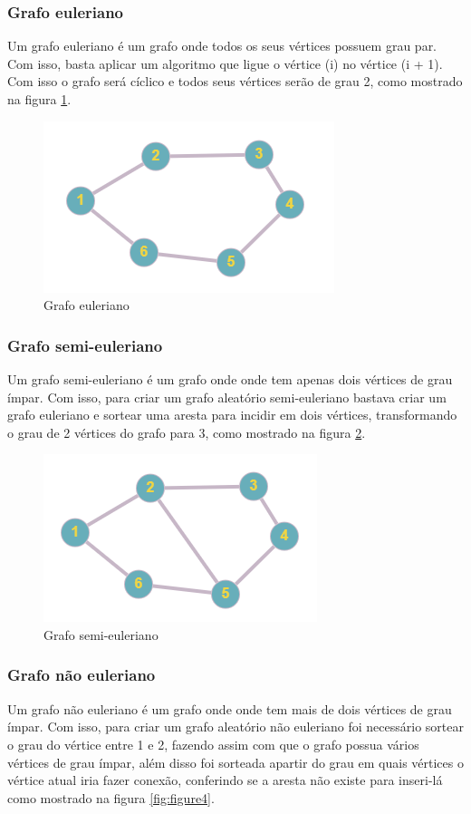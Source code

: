 \subsubsection{\esp Grafo euleriano}
Um grafo euleriano é um grafo onde todos os seus vértices possuem grau par. Com isso, basta aplicar um algoritmo que ligue o vértice (i) no vértice (i + 1). Com isso o grafo será cíclico e todos seus vértices serão de grau 2, como mostrado na figura \ref{fig:figure2}.

\begin{figure}[ht]
    \centering
    \includegraphics[width=.2\textwidth]{figuras/eureliano.png}
    \caption{Grafo euleriano}
    \label{fig:figure2}
\end{figure}

\subsubsection{\esp Grafo semi-euleriano}
Um grafo semi-euleriano é um grafo onde onde tem apenas dois vértices de grau ímpar. Com isso, para criar um grafo aleatório semi-euleriano bastava criar um grafo euleriano e sortear uma aresta para incidir em dois vértices, transformando o grau de 2 vértices do grafo para 3, como mostrado na figura \ref{fig:figure3}.

\begin{figure}[ht]
    \centering
    \includegraphics[width=.2\textwidth]{figuras/semi-eureliano.png}
    \caption{Grafo semi-euleriano}
    \label{fig:figure3}
\end{figure}

\subsubsection{\esp Grafo não euleriano}
Um grafo não euleriano é um grafo onde onde tem mais de dois vértices de grau ímpar. Com isso, para criar um grafo aleatório não euleriano foi necessário sortear o grau do vértice entre 1 e 2, fazendo assim com que o grafo possua vários vértices de grau ímpar, além disso foi sorteada apartir do grau em quais vértices o vértice atual iria fazer conexão, conferindo se a aresta não existe para inseri-lá como mostrado na figura \ref{fig:figure4}.

